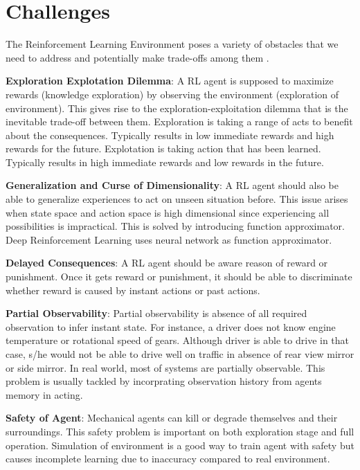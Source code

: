 \section{Challenges}
\label{sec:chal}

The Reinforcement Learning Environment poses a variety of obstacles that we need to address and potentially make trade-offs among them \cite{dulac-arnold_challenges_2019} \cite{sutton_reinforcement_1998}. 

\textbf{Exploration Explotation Dilemma}: A RL agent is supposed to maximize rewards (knowledge exploration) by observing the environment (exploration of environment). This gives rise to the exploration-exploitation dilemma that is the inevitable trade-off between them. Exploration is taking a range of acts to benefit about the consequences. Typically results in low immediate rewards and high rewards for the future. Explotation is taking action that has been learned. Typically results in high immediate rewards and low rewards in the future.

\textbf{Generalization and Curse of Dimensionality}: A RL agent should also be able to generalize experiences to act on unseen situation before. This issue arises when state space and action space is high dimensional since experiencing all possibilities is impractical. This is solved by introducing function approximator. Deep Reinforcement Learning uses neural network as function approximator. 

\textbf{Delayed Consequences}: A RL agent should be aware reason of reward or punishment. Once it gets reward or punishment, it should be able to discriminate whether reward is caused by instant actions or past actions.

\textbf{Partial Observability}: Partial observability is absence of all required observation to infer instant state. For instance, a driver does not know engine temperature or rotational speed of gears. Although driver is able to drive in that case, s/he would not be able to drive well on traffic in absence of rear view mirror or side mirror. In real world, most of systems are partially observable. This problem is usually tackled by incorprating observation history from agents memory in acting.

\textbf{Safety of Agent}: Mechanical agents can kill or degrade themselves and their surroundings. This safety problem is important on both exploration stage and full operation. Simulation of environment is a good way to train agent with safety but causes incomplete learning due to inaccuracy compared to real environment. 
